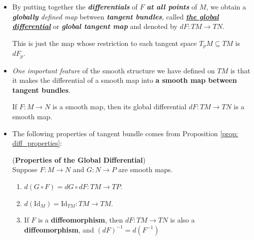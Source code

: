 \documentclass[11pt]{article}
\begin{document}
\begin{itemize}
\item \begin{definition}
By putting together the \emph{\textbf{differentials}} of $F$ \emph{\textbf{at all points}} of $M$, we obtain a \emph{\textbf{globally} defined map} between \emph{\textbf{tangent bundles}}, called \underline{\emph{\textbf{the global differential}}} or \emph{\textbf{global tangent map}} and denoted by $dF: TM \rightarrow TN$.

This is just the map whose restriction to each tangent space $T_{p}M \subseteq TM$ is $dF_{p}$.
\end{definition}

\item \emph{One important feature} of the smooth structure we have defined on $TM$ is that it makes the differential of a smooth map into \textbf{a smooth map between tangent bundles}. 
\begin{proposition}
If $F: M \rightarrow N$ is a smooth map, then its global differential $dF: TM \rightarrow TN$ is a smooth map.
\end{proposition}

\item The following properties of tangent bundle comes from Proposition \ref{prop: diff_properties}:
\begin{corollary} (\textbf{Properties of the Global Differential}) \citep{lee2003introduction} \\
Suppose $F: M \rightarrow N$ and $G: N \rightarrow P$ are smooth maps.
\begin{enumerate}
\item $d(G \circ F) = dG \circ dF: TM \rightarrow TP$.
\item $d(\text{Id}_{M}) = \text{Id}_{TM}: TM \rightarrow TM$.
\item If $F$ is a \textbf{diffeomorphism}, then $dF: TM \rightarrow TN$ is also a  \textbf{diffeomorphism}, and
$(dF)^{-1} = d(F^{-1})$
\end{enumerate}
\end{corollary}
\end{itemize}
\end{document}
